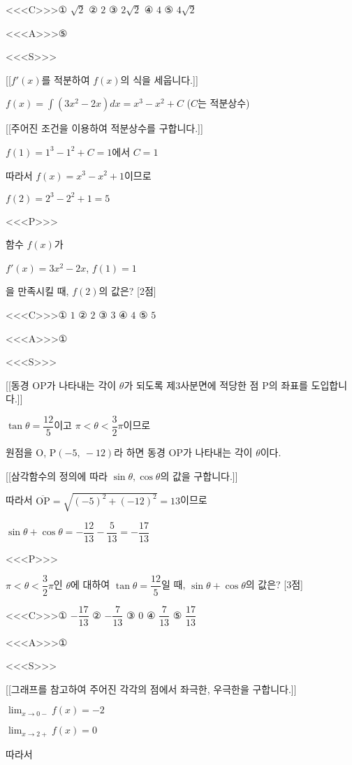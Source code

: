 \documentclass{oblivoir}
\begin{document}
<<<C>>>① $\sqrt{2}$ ② $2$ ③ $2\sqrt{2}$ ④ $4$ ⑤ $4\sqrt{2}$

<<<A>>>⑤

<<<S>>>

[[$f'(x)$를 적분하여 $f(x)$의 식을 세웁니다.]]

$f(x)$$=\displaystyle\int(3x^{2}-2x)dx$$=x^{3}-x^{2}+C$ ($C$는 적분상수)

[[주어진 조건을 이용하여 적분상수를 구합니다.]]

$f(1)=1^{3}-1^{2}+C=1$에서 $C=1$

따라서 $f(x)= x^{3}-x^{2}+1$이므로

$f(2)= 2^{3}-2^{2}+1=5$

<<<P>>>

함수 $f(x)$가

$f'(x)=3x^{2}-2x$, $f(1)=1$

을 만족시킬 때, $f(2)$의 값은? [2점]

<<<C>>>① $1$ ② $2$ ③ $3$ ④ $4$ ⑤ $5$

<<<A>>>①

<<<S>>>

[[동경 $\mathrm{OP}$가 나타내는 각이 $\theta$가 되도록 제$3$사분면에 적당한 점 $\mathrm{P}$의 좌표를 도입합니다.]]

$\tan\theta =\dfrac{12}{5}$이고 $\pi < \theta < \dfrac{3}{2}\pi$이므로

원점을 $\mathrm{O}$, $\mathrm{P}(-5,\:-12)$라 하면 동경 $\mathrm{OP}$가 나타내는 각이 $\theta$이다.

[[삼각함수의 정의에 따라 $\sin\theta, \cos\theta$의 값을 구합니다.]]

따라서 $\overline{\mathrm{OP}}=\sqrt{(-5)^{2}+(-12)^{2}}=13$이므로

$\sin\theta +\cos\theta =-\dfrac{12}{13}-\dfrac{5}{13}= -\dfrac{17}{13}$

<<<P>>>

$\pi < \theta < \dfrac{3}{2}\pi$인 $\theta$에 대하여 $\tan\theta =\dfrac{12}{5}$일 때, $\sin\theta +\cos\theta$의 값은? [3점]

<<<C>>>① $-\dfrac{17}{13}$ ② $-\dfrac{7}{13}$ ③ $0$ ④ $\dfrac{7}{13}$ ⑤ $\dfrac{17}{13}$

<<<A>>>①

<<<S>>>

[[그래프를 참고하여 주어진 각각의 점에서 좌극한, 우극한을 구합니다.]]

$\displaystyle\lim_{x\to 0-}f(x)= -2$

$\displaystyle\lim_{x\to 2+}f(x)=0$

따라서
\end{document}
